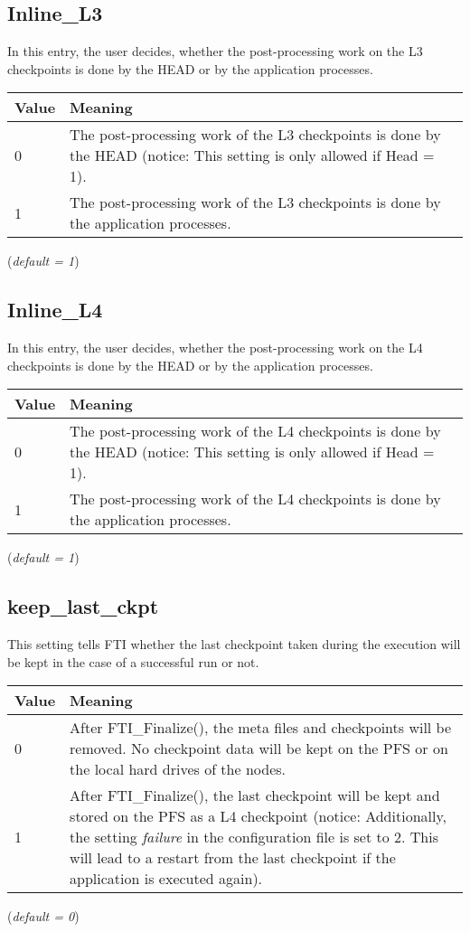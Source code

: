 \documentclass{refrep}
\begin{document}
\subsection{Inline\_L3}\label{subsec:inlinel3}
In this entry, the user decides, whether the post-processing work on the L3 checkpoints is done by the HEAD or by the application processes.
\begin{center}
\begin{tabular}[h!]{|p{}|p{}|}
\hline
\textbf{Value} & \textbf{Meaning} \\ \hline
0 & The post-processing work of the L3 checkpoints is done by the HEAD (notice: This setting is only allowed if Head = 1).  \\ \hline
1 & The post-processing work of the L3 checkpoints is done by the application processes.  \\ \hline
\end{tabular}
\end{center}
(\textit{default = 1})
\subsection{Inline\_L4}\label{subsec:inlinel4}
In this entry, the user decides, whether the post-processing work on the L4 checkpoints is done by the HEAD or by the application processes.
\begin{center}
\begin{tabular}[h!]{|p{}|p{}|}
\hline
\textbf{Value} & \textbf{Meaning} \\ \hline
0 & The post-processing work of the L4 checkpoints is done by the HEAD (notice: This setting is only allowed if Head = 1).  \\ \hline
1 & The post-processing work of the L4 checkpoints is done by the application processes.  \\ \hline
\end{tabular}
\end{center}
(\textit{default = 1})
\subsection{keep\_last\_ckpt}\label{subsec:keeplastckpt}
This setting tells FTI whether the last checkpoint taken during the execution will be kept in the case of a successful run or not.
\begin{center}
\begin{tabular}[h!]{|p{}|p{}|}
\hline
\textbf{Value} & \textbf{Meaning} \\ \hline
0 & After {\asciifamily FTI\_Finalize()}, the meta files and checkpoints will be removed. No checkpoint data will be kept on the PFS or on the local hard drives of the nodes.  \\ \hline
1 & After {\asciifamily FTI\_Finalize()}, the last checkpoint will be kept and stored on the PFS as a L4 checkpoint (notice: Additionally, the setting \emph{failure} in the configuration file is set to 2. This will lead to a restart from the last checkpoint if the application is executed again).  \\ \hline
\end{tabular}
\end{center}
(\textit{default = 0})
\end{document}
